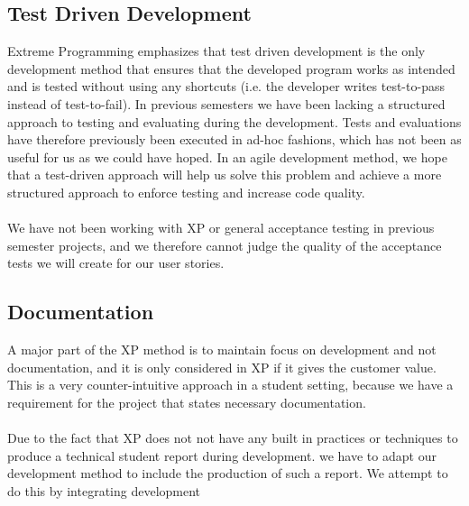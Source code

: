 \subsection{Test Driven Development}
\label{sub:test_driven_development}
Extreme Programming emphasizes that test driven development is the only development method that ensures that the developed program works as intended and is tested without using any shortcuts (i.e. the developer writes test-to-pass instead of test-to-fail). In previous semesters we have been lacking a structured approach to testing and evaluating during the development. Tests and evaluations have therefore previously been executed in ad-hoc fashions, which has not been as useful for us as we could have hoped. In an agile development method, we hope that a test-driven approach will help us solve this problem and achieve a more structured approach to enforce testing and increase code quality.
\\\\
We have not been working with XP or general acceptance testing in previous semester projects, and we therefore cannot judge the quality of the acceptance tests we will create for our user stories.

\subsection{Documentation}
A major part of the XP method is to maintain focus on development and not documentation, and it is only considered in XP if it gives the customer value. This is a very counter-intuitive approach in a student setting, because we have a requirement for the project that states necessary documentation. 
\\\\
Due to the fact that XP does not not have any built in practices or techniques to produce a technical student report during development. we have to adapt our development method to include the production of such a report. We attempt to do this by integrating development 









